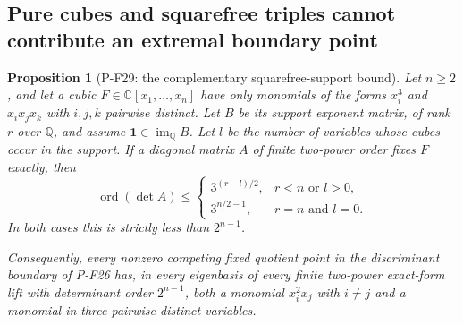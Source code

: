 \documentclass[11pt,a4paper]{article}
\newtheorem{proposition}{Proposition}[section]
\begin{document}
\subsection{Pure cubes and squarefree triples cannot contribute an extremal boundary point}

\begin{proposition}[P-F29: the complementary squarefree-support bound]
\label{prop:cubicsquarefreesupport}
Let $n\ge2$, and let a cubic $F\in\mathbb C[x_1,\ldots,x_n]$
have only monomials of the forms $x_i^3$ and $x_ix_jx_k$
with $i,j,k$ pairwise distinct. Let $B$ be its support
exponent matrix, of rank $r$ over $\mathbb Q$, and assume
$\mathbf1\in\operatorname{im}_{\mathbb Q}B$. Let $l$ be the
number of variables whose cubes occur in the support.
If a diagonal matrix $A$ of finite two-power order fixes
$F$ exactly, then
\[
 \operatorname{ord}(\det A)\le
 \begin{cases}
  3^{(r-l)/2},&r<n\text{ or }l>0,\\
  3^{n/2-1},&r=n\text{ and }l=0.
 \end{cases}
 \tag{P-F29a}
\]
In both cases this is strictly less than $2^{n-1}$.

Consequently, every nonzero competing fixed quotient point
in the discriminant boundary of P-F26 has, in every
eigenbasis of every finite two-power exact-form lift with
determinant order $2^{n-1}$, both a monomial $x_i^2x_j$
with $i\ne j$ and a monomial in three pairwise distinct
variables.
\end{proposition}
\end{document}
